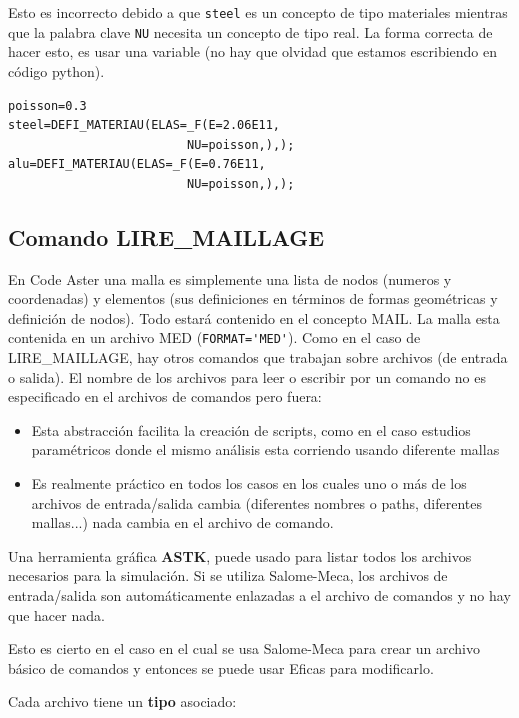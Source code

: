 \documentclass[12pt]{book}
\theoremstyle{definition}
\theoremstyle{remark}
\theoremstyle{plain}
\begin{document}
Esto es incorrecto debido a que \verb*|steel| es un concepto de tipo materiales
mientras que la palabra clave \verb*|NU| necesita un concepto de tipo real. La 
forma correcta de hacer esto, es usar una variable (no hay que olvidad que estamos
escribiendo en código python).

\begin{verbatim}
poisson=0.3
steel=DEFI_MATERIAU(ELAS=_F(E=2.06E11,
                         NU=poisson,),);
alu=DEFI_MATERIAU(ELAS=_F(E=0.76E11,
                         NU=poisson,),);
\end{verbatim}

\subsection{Comando LIRE\_MAILLAGE}
En Code Aster una malla es simplemente una lista de nodos (numeros y coordenadas)
y elementos (sus definiciones en términos de formas geométricas y definición 
de nodos). Todo estará contenido en el concepto MAIL. La malla esta contenida
en un archivo MED (\verb*|FORMAT='MED'|). Como en el caso de LIRE\_MAILLAGE, hay 
otros comandos que trabajan sobre archivos (de entrada o salida). El nombre
de los archivos para leer o escribir por un comando no es especificado en el archivos
de comandos pero fuera:
\begin{itemize}
 \item Esta abstracción facilita la creación de scripts, como en el caso estudios 
paramétricos donde el mismo análisis esta corriendo usando diferente mallas
 \item Es realmente práctico en todos los casos en los cuales uno o más de los 
archivos de entrada/salida cambia (diferentes nombres o paths, diferentes mallas...)
nada cambia en el archivo de comando.
\end{itemize}

Una herramienta gráfica \textbf{ASTK}, puede usado para listar todos los archivos 
necesarios para la simulación.
Si se utiliza Salome-Meca, los archivos de entrada/salida son automáticamente 
enlazadas a el archivo de comandos y no hay que hacer nada.

Esto es cierto en el caso en el cual se usa Salome-Meca para crear un archivo 
básico de comandos y entonces se puede usar Eficas para modificarlo.

Cada archivo tiene un \textbf{tipo} asociado:
\end{document}
